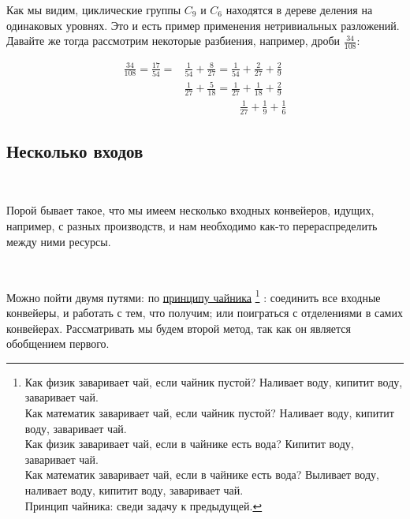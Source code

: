 \vspace{0.3in}

Как мы видим, циклические группы $C_9$ и $C_6$ находятся в дереве деления на одинаковых уровнях. Это и есть пример применения нетривиальных разложений. Давайте же тогда рассмотрим некоторые разбиения, например, дроби $\frac{34}{108}$:


\begin{align*}
	\frac{34}{108} = \frac{17}{54} = &\frac{1}{54} + \frac{8}{27} = \frac{1}{54} + \frac{2}{27} + \frac{2}{9} \\
	&\frac{1}{27} + \frac{5}{18} = \frac{1}{27} + \frac{1}{18} + \frac{2}{9} \\
	&\quad\quad\quad\quad\quad\frac{1}{27} + \frac{1}{9} + \frac{1}{6}
\end{align*}















\vspace{0.5in}

\subsection{Несколько входов}

\

Порой бывает такое, что мы имеем несколько входных конвейеров, идущих, например, с разных производств, и нам необходимо как-то перераспределить между ними ресурсы.

\

Можно пойти двумя путями: по \underline{принципу чайника}%
\footnote{Как физик заваривает чай, если чайник пустой? Наливает воду, кипитит воду, заваривает чай. \\ Как математик заваривает чай, если чайник пустой? Наливает воду, кипитит воду, заваривает чай. \\ Как физик заваривает чай, если в чайнике есть вода? Кипитит воду, заваривает чай. \\ Как математик заваривает чай, если в чайнике есть вода? Выливает воду, наливает воду, кипитит воду, заваривает чай. \\ Принцип чайника: сведи задачу к предыдущей.}
: соединить все входные конвейеры, и работать с тем, что получим; или  поиграться с отделениями в самих конвейерах. Рассматривать мы будем второй метод, так как он является обобщением первого.

